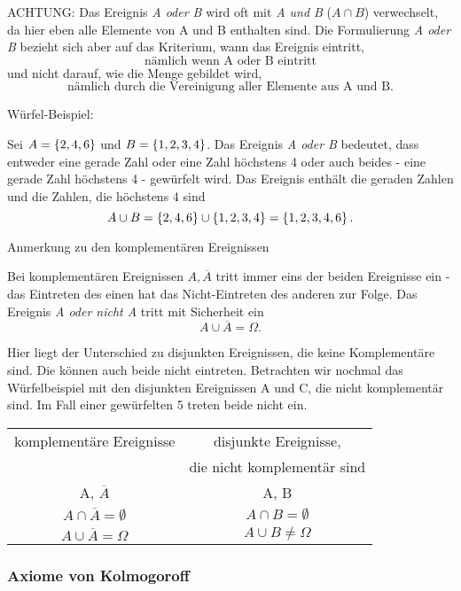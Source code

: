 ACHTUNG: Das Ereignis  \emph{A oder B} wird oft mit \emph{A und B} ($A\cap B$) verwechselt, da hier eben alle Elemente von A und B enthalten sind. 
Die Formulierung \emph{A oder B} bezieht sich aber auf das Kriterium, wann das Ereignis eintritt, 
$$\text{nämlich wenn A oder B eintritt}$$
und nicht darauf, wie die Menge gebildet wird,
 $$\text{nämlich durch die Vereinigung aller Elemente aus A und B}.$$

Würfel-Beispiel:

Sei $A = \gkl{2,4,6}$ und $B=\gkl{1,2,3,4}$. Das Ereignis \emph{A oder B} bedeutet, dass entweder eine gerade Zahl oder eine Zahl höchstens 4 oder auch beides - eine gerade Zahl höchstens 4 - gewürfelt wird. Das Ereignis enthält die geraden Zahlen und die Zahlen, die höchstens 4 sind 
$$A\cup B = \gkl{2,4,6} \cup \gkl{1,2,3,4}= \gkl{1,2,3,4,6}.$$

Anmerkung zu den komplementären Ereignissen

Bei komplementären Ereignissen $A, \overline{A}$ tritt immer eins der beiden Ereignisse ein - das Eintreten des einen hat das Nicht-Eintreten des anderen zur Folge. Das Ereignis \emph{A oder nicht A} tritt mit Sicherheit ein $$A \cup \overline{A} = \Omega.$$

Hier liegt der Unterschied zu disjunkten Ereignissen, die keine Komplementäre sind. Die können auch beide nicht eintreten. 
Betrachten wir nochmal das Würfelbeispiel mit den disjunkten Ereignissen A und C, die nicht komplementär sind. Im Fall einer gewürfelten 5 treten beide nicht ein.



\begin{center}
\begin{tabular}{|c|c|}\hline
	komplementäre Ereignisse & disjunkte Ereignisse,\\ 
	 & die nicht komplementär sind \\ \hline
	A, $\overline A$ & A, B\\
	$A\cap \overline{A} = \emptyset$ & 	$A\cap B = \emptyset$ \\
	$A\cup \overline{A} =\Omega$ & $A\cup B \neq\Omega$\\\hline
\end{tabular}
\end{center}

\subsubsection{Axiome von Kolmogoroff}

